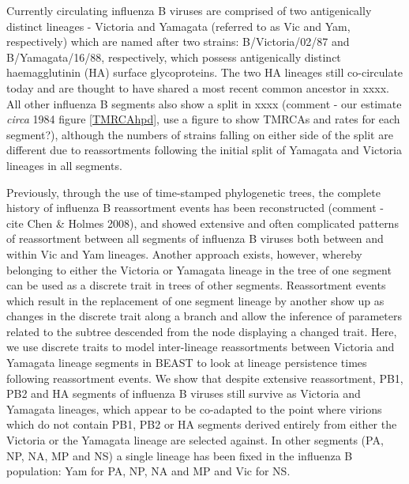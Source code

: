 \documentclass[11pt,oneside,letterpaper]{article}
\begin{document}
Currently circulating influenza B viruses are comprised of two antigenically distinct lineages - Victoria and Yamagata (referred to as Vic and Yam, respectively) which are named after two strains: B/Victoria/02/87 and B/Yamagata/16/88, respectively, which possess antigenically distinct haemagglutinin (HA) surface glycoproteins. 
The two HA lineages still co-circulate today and are thought to have shared a most recent common ancestor in xxxx. 
All other influenza B segments also show a split in xxxx (comment - our estimate \textit{circa} 1984 figure \ref{TMRCAhpd}, use a figure to show TMRCAs and rates for each segment?), although the numbers of strains falling on either side of the split are different due to reassortments following the initial split of Yamagata and Victoria lineages in all segments.


Previously, through the use of time-stamped phylogenetic trees, the complete history of influenza B reassortment events has been reconstructed (comment - cite Chen \& Holmes 2008), and showed extensive and often complicated patterns of reassortment between all segments of influenza B viruses both between and within Vic and Yam lineages.
Another approach exists, however, whereby belonging to either the Victoria or Yamagata lineage in the tree of one segment can be used as a discrete trait in trees of other segments.
Reassortment events which result in the replacement of one segment lineage by another show up as changes in the discrete trait along a branch and allow the inference of parameters related to the subtree descended from the node displaying a changed trait.
Here, we use discrete traits to model inter-lineage reassortments between Victoria and Yamagata lineage segments in BEAST to look at lineage persistence times following reassortment events. 
We show that despite extensive reassortment, PB1, PB2 and HA segments of influenza B viruses still survive as Victoria and Yamagata lineages, which appear to be co-adapted to the point where virions which do not contain PB1, PB2 or HA segments derived entirely from either the Victoria or the Yamagata lineage are selected against.
In other segments (PA, NP, NA, MP and NS) a single lineage has been fixed in the influenza B population: Yam for PA, NP, NA and MP and Vic for NS.
\end{document}
